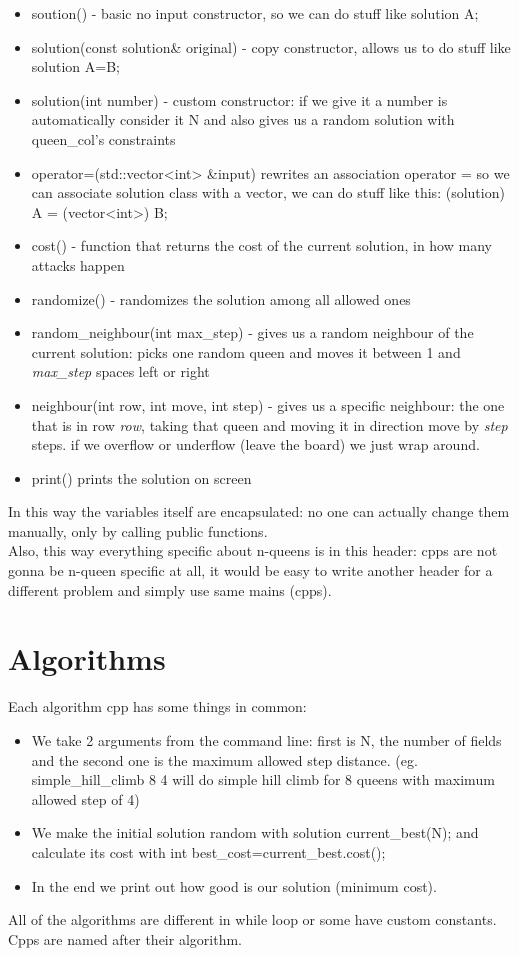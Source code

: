 \documentclass[10pt,a4paper]{article}
\begin{document}
			\begin{itemize}
				\item soution() - basic no input constructor, so we can do stuff like solution A;
				\item solution(const solution\& original) - copy constructor, allows us to do stuff like solution A=B;
				\item solution(int number) - custom constructor: if we give it a number is automatically consider it N and also gives us a random solution with queen\_col's constraints
				\item operator=(std::vector<int> \&input) rewrites an association operator = so we can associate solution class with a vector, we can do stuff like this: (solution) A = (vector<int>) B;
				\item cost() - function that returns the cost of the current solution, in how many attacks happen
				\item randomize() - randomizes the solution among all allowed ones
				\item random\_neighbour(int max\_step) - gives us a random neighbour of the current solution: picks one random queen and moves it between 1 and \textit{max\_step} spaces left or right
				\item neighbour(int row, int move, int step) - gives us a specific neighbour: the one that is in row \textit{row}, taking that queen and moving it in direction move by \textit{step} steps. if we overflow or underflow (leave the board) we just wrap around.
				\item print() prints the solution on screen
			\end{itemize}
			In this way the variables itself are encapsulated: no one can actually change them manually, only by calling public functions. \\
			Also, this way everything specific about n-queens is in this header: cpps are not gonna be n-queen specific at all, it would be easy to write another header for a different problem and simply use same mains (cpps).
	\pagebreak
	\section{Algorithms}
		Each algorithm cpp has some things in common:
		\begin{itemize}
			\item We take 2 arguments from the command line: first is N, the number of fields and the second one is the maximum allowed step distance. (eg. simple\_hill\_climb 8 4 will do simple hill climb for 8 queens with maximum allowed step of 4)\\
			\item We make the initial solution random with solution current\_best(N); and calculate its cost with int best\_cost=current\_best.cost();
			\item In the end we print out how good is our solution (minimum cost).
		\end{itemize}
		All of the algorithms are different in while loop or some have custom constants.\\
		Cpps are named after their algorithm.
\end{document}
